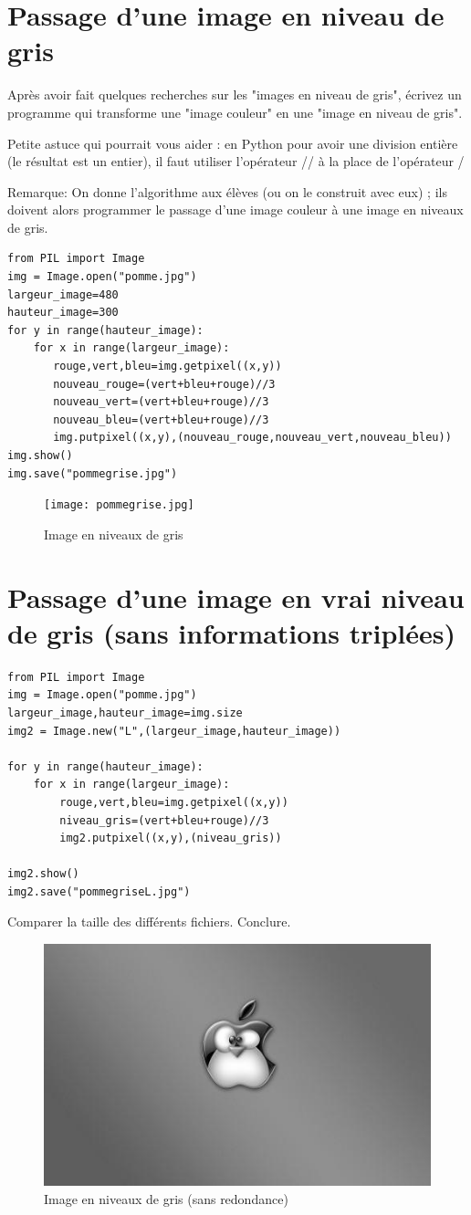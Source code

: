 \documentclass[11pt]{article}
\begin{document}
\section{Passage d'une image en niveau de gris}
\label{sec:org740a7b0}

Après avoir fait quelques recherches sur les "images en niveau de gris", écrivez un programme qui transforme une "image couleur" en une "image en niveau de gris".

Petite astuce qui pourrait vous aider : en Python pour avoir une division entière (le résultat est un entier), il faut utiliser l'opérateur // à la place de l'opérateur / 

Remarque: On donne l'algorithme aux élèves (ou on le construit avec eux) ; ils doivent alors programmer le passage d'une image couleur à une image en niveaux de gris.


\begin{verbatim}
from PIL import Image
img = Image.open("pomme.jpg")
largeur_image=480
hauteur_image=300
for y in range(hauteur_image):
    for x in range(largeur_image):
       rouge,vert,bleu=img.getpixel((x,y))
       nouveau_rouge=(vert+bleu+rouge)//3
       nouveau_vert=(vert+bleu+rouge)//3
       nouveau_bleu=(vert+bleu+rouge)//3
       img.putpixel((x,y),(nouveau_rouge,nouveau_vert,nouveau_bleu))
img.show()
img.save("pommegrise.jpg")
\end{verbatim}

\begin{figure}[htbp]
\centering
\texttt{[image: pommegrise.jpg]}
\caption{Image en niveaux de gris}
\end{figure}


\section{Passage d'une image en vrai niveau de gris (sans informations triplées)}
\label{sec:org9c6bfe3}


\begin{verbatim}
from PIL import Image
img = Image.open("pomme.jpg")
largeur_image,hauteur_image=img.size
img2 = Image.new("L",(largeur_image,hauteur_image))

for y in range(hauteur_image):
    for x in range(largeur_image):
        rouge,vert,bleu=img.getpixel((x,y))
        niveau_gris=(vert+bleu+rouge)//3
        img2.putpixel((x,y),(niveau_gris))

img2.show()
img2.save("pommegriseL.jpg")
\end{verbatim}

Comparer la taille des différents fichiers. Conclure.

\begin{figure}[htbp]
\centering
\includegraphics[width=.9\linewidth]{pommegriseL.jpg}
\caption{Image en niveaux de gris (sans redondance)}
\end{figure}
\end{document}
